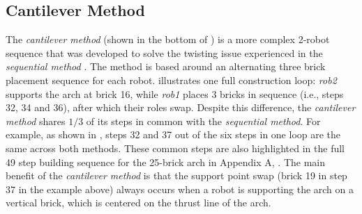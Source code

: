 \subsection{Cantilever Method} \label{sec:cantilever}
The \textit{cantilever method} (shown in the bottom of ) is a more complex 2-robot sequence that was developed to solve the twisting issue experienced in the \textit{sequential method} \cite{parascho_robotic_2020}. The method is based around an alternating three brick placement sequence for each robot.  illustrates one full construction loop: \textit{rob2} supports the arch at brick 16, while \textit{rob1} places 3 bricks in sequence (i.e., steps 32, 34 and 36), after which their roles swap. Despite this difference, the \textit{cantilever method} shares $1/3$ of its steps in common with the \textit{sequential method}. For example, as shown in , steps 32 and 37 out of the six steps in one loop are the same across both methods. These common steps are also highlighted in the full 49 step building sequence for the 25-brick arch in Appendix A, . The main benefit of the \textit{cantilever method} is that the support point swap (brick 19 in step 37 in the example above) always occurs when a robot is supporting the arch on a vertical brick, which is centered on the thrust line of the arch.

